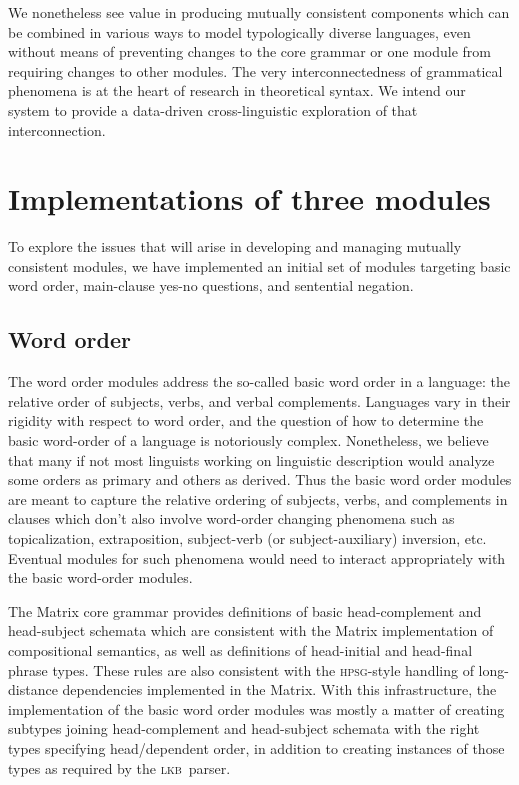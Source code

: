 \documentclass[11pt]{article}
\newcommand{\hpsg}{\textsc{hpsg}}
\newcommand{\lkb}{\textsc{lkb}}
\begin{document}
We nonetheless see value in producing mutually consistent
components which can be combined in various ways to model
typologically diverse languages, even without means of 
preventing changes to the core grammar or one module from requiring
changes to other modules.  The very interconnectedness of grammatical
phenomena is at the heart of research in theoretical syntax.  We
intend our system to provide a data-driven cross-linguistic
exploration of that interconnection.

\section{Implementations of three modules}
\label{imp}

To explore the issues that will arise in developing and managing
mutually consistent modules, we have
implemented an initial set of modules targeting basic
word order, main-clause yes-no questions, and sentential negation.  

\subsection{Word order}

The word order modules address the so-called basic word order in
a language: the relative order of subjects, verbs, and verbal complements.
Languages vary in their rigidity with respect to word order, and the
question of how to determine the basic word-order of a language is 
notoriously complex.  Nonetheless, we believe that many if not most
linguists working on linguistic description would analyze some orders
as primary and others as derived.  Thus the basic word order modules
are meant to capture the relative ordering of subjects, verbs, and complements
in clauses which don't also involve word-order changing phenomena
such as topicalization, extraposition, subject-verb (or subject-auxiliary)
inversion, etc.  Eventual modules for such phenomena would need to
interact appropriately with the basic word-order modules.

The Matrix core grammar provides definitions of basic
head-complement and head-subject schemata which are consistent with
the Matrix implementation of compositional semantics,
as well as definitions of head-initial and
head-final phrase types.  These rules are also consistent with the
{\hpsg}-style handling of long-distance dependencies implemented in the
Matrix.
With this infrastructure, the implementation of the basic
word order modules was mostly a matter of creating subtypes joining
head-complement and head-subject schemata with the right types
specifying head/dependent order, in addition to creating instances of
those types as required by the \lkb\ parser.
\end{document}
